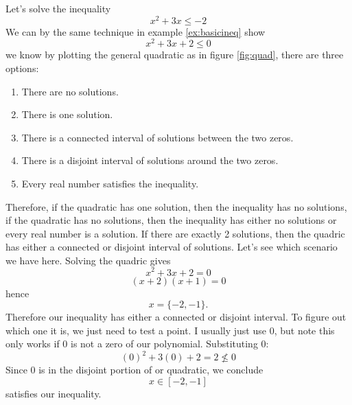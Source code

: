 \begin{ex}
	Let's solve the inequality
	$$x^2+3x\le-2$$
	We can by the same technique in example \eqref{ex:basicineq} show
	$$x^2+3x+2\le0$$
	we know by plotting the general quadratic as in figure \eqref{fig:quad}, there are three options:
	\begin{figure}
		\centering
		\caption{}
		\label{fig:quad}
	\end{figure}
	\begin{enumerate}
		\item There are no solutions.
		\item There is one solution.
		\item There is a connected interval of solutions between the two zeros.
		\item There is a disjoint interval of solutions around the two zeros.
		\item Every real number satisfies the inequality.
	\end{enumerate}
	Therefore, if the quadratic has one solution, then the inequality has no solutions, if the quadratic has no solutions, then the inequality has either no solutions or every real number is a solution. If there are exactly 2 solutions, then the quadric has either a connected or disjoint interval of solutions. Let's see which scenario we have here. Solving the quadric gives
	$$x^2+3x+2=0$$
	$$(x+2)(x+1)=0$$
	hence
	$$x=\{-2,-1\}.$$
	Therefore our inequality has either a connected or disjoint interval. To figure out which one it is, we just need to test a point. I usually just use 0, but note this only works if 0 is not a zero of our polynomial. Substituting 0:
	$$(0)^2+3(0)+2=2\not\le 0$$
	Since $0$ is in the disjoint portion of or quadratic, we conclude
	$$x\in[-2,-1]$$
	satisfies our inequality.
\end{ex}

